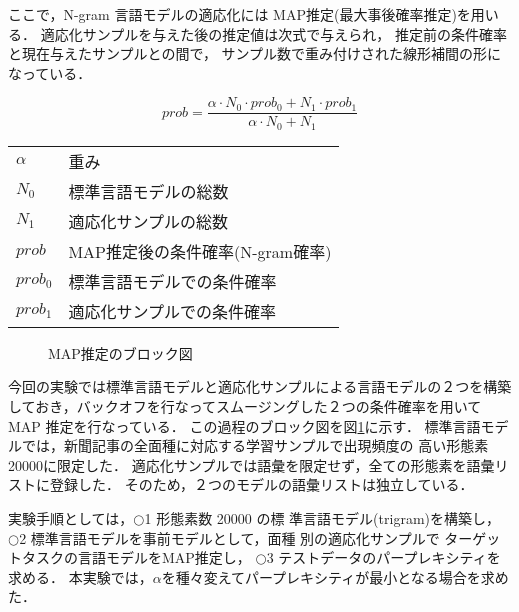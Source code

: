  ここで，N-gram 言語モデルの適応化には
 MAP推定(最大事後確率推定)\cite{test7,test18,test19,test26}を用いる．
 適応化サンプルを与えた後の推定値は次式で与えられ，
 推定前の条件確率と現在与えたサンプルとの間で，
 サンプル数で重み付けされた線形補間の形になっている．

\begin{center}
\begin{equation}
 prob = \frac{\alpha \cdot N_0 \cdot prob_0 + N_1 \cdot prob_1}
             {\alpha \cdot N_0 + N_1}
\end{equation}

\small\gt
\begin{tabular}{l l}
$\alpha$ & 重み \\
$N_0$ & 標準言語モデルの総数 \\
$N_1$ & 適応化サンプルの総数 \\
$prob$ & MAP推定後の条件確率(N-gram確率) \\
$prob_0$ & 標準言語モデルでの条件確率 \\
$prob_1$ & 適応化サンプルでの条件確率 \\
\end{tabular}
\end{center}

\begin{figure}[htbp]
\begin{center}
\end{center}
\caption{MAP推定のブロック図}
\label{fig:block}
\end{figure}


今回の実験では標準言語モデルと適応化サンプルによる言語モデルの２つを構築
しておき，バックオフを行なってスムージングした２つの条件確率を用いて 
MAP 推定を行なっている．
この過程のブロック図を図\ref{fig:block}に示す．
標準言語モデルでは，\mbox{新聞記事の全面種に対応する学習サン}プルで出現頻度の
高い形態素20000に限定した．
適応化サンプルでは語彙を限定せず，全ての形態素を語彙リストに登録した．
そのため，２つのモデルの語彙リストは独立している．


実験手順としては，{\large$\bigcirc$\hspace{-.73em}}1 \hspace{0.3mm}形態素数 20000 の標
準言語モデル(trigram)を構築し， 
{\large$\bigcirc$\hspace{-.73em}}2 \hspace{0.3mm}\mbox{標準言語モ}デルを事前モデルとして，面種
別の適応化サンプルで ターゲットタスクの言語モデルをMAP推定し，
{\large$\bigcirc$\hspace{-.73em}}3 \hspace{0.3mm}テストデータのパープレキシティを求める．
本実験では，$\alpha$を種々変えてパープレキシティが最小となる場合を求めた．


